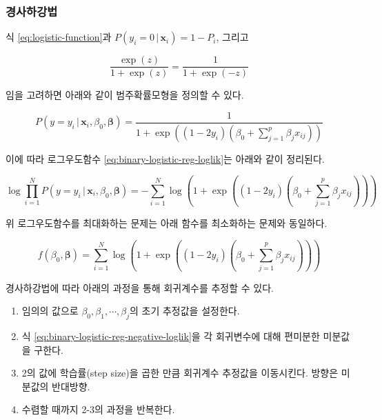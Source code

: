 \documentclass[
]{book}
\providecommand{\tightlist}{%
  \setlength{\itemsep}{0pt}\setlength{\parskip}{0pt}}
\begin{document}
\hypertarget{binary-logistic-gradient-descent}{%
\subsubsection{경사하강법}\label{binary-logistic-gradient-descent}}

식 \eqref{eq:logistic-function}과 \(P(y_i = 0 \,|\, \mathbf{x}_i) = 1 - P_i\), 그리고

\begin{equation*}
\frac{\exp(z)}{1 + \exp(z)} = \frac{1}{1 + \exp(-z)}
\end{equation*}

임을 고려하면 아래와 같이 범주확률모형을 정의할 수 있다.

\begin{equation*}
P(y = y_i \,|\, \mathbf{x}_i, \beta_0, \boldsymbol\beta) = \frac{1}{1 + \exp\left((1 - 2y_i)(\beta_0 + \sum_{j = 1}^{p} \beta_j x_{ij})\right)}
\end{equation*}

이에 따라 로그우도함수 \eqref{eq:binary-logistic-reg-loglik}는 아래와 같이 정리된다.

\begin{equation*}
\log \prod_{i = 1}^{N} P(y = y_i \,|\, \mathbf{x}_i, \beta_0, \boldsymbol\beta) = - \sum_{i = 1}^{N} \log \left(1 + \exp\left((1 - 2y_i)(\beta_0 + \sum_{j = 1}^{p} \beta_j x_{ij})\right)\right)
\end{equation*}

위 로그우도함수를 최대화하는 문제는 아래 함수를 최소화하는 문제와 동일하다.

\begin{equation}
f(\beta_0, \boldsymbol\beta) = \sum_{i = 1}^{N} \log \left(1 + \exp\left((1 - 2y_i)(\beta_0 + \sum_{j = 1}^{p} \beta_j x_{ij})\right)\right)
\label{eq:binary-logistic-reg-negative-loglik}
\end{equation}

경사하강법에 따라 아래의 과정을 통해 회귀계수를 추정할 수 있다.

\begin{enumerate}
\def\labelenumi{\arabic{enumi}.}
\tightlist
\item
  임의의 값으로 \(\beta_0, \beta_1, \cdots, \beta_j\)의 초기 추정값을 설정한다.
\item
  식 \eqref{eq:binary-logistic-reg-negative-loglik}을 각 회귀변수에 대해 편미분한 미분값을 구한다.
\item
  2의 값에 학습률(step size)을 곱한 만큼 회귀계수 추정값을 이동시킨다. 방향은 미분값의 반대방향.
\item
  수렴할 때까지 2-3의 과정을 반복한다.
\end{enumerate}
\end{document}
